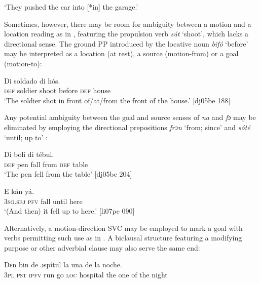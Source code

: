 \glt ‘They pushed the car into [*in] the garage.’ 
\z

Sometimes, however, there may be room for ambiguity between a motion and a location reading as in , featuring the propulsion verb \textit{sút} ‘shoot’, which lacks a directional sense. The ground PP introduced by the locative noun \textit{bifó} ‘before’ may be interpreted as a location (at rest), a source (motion-from) or a goal (motion-to): 


\ea%
    \label{ex:key:974}
    \gll Di  soldado          di  hós.\\
\textsc{def}  soldier  shoot  before  \textsc{def}  house\\

\glt ‘The soldier shot in front of/at/from the front of the house.’ [dj05be 188]
\z

Any potential ambiguity between the goal and source senses of \textit{na} and \textit{fɔ} may be eliminated by employing the directional prepositions \textit{frɔn} ‘from; since’  and \textit{sóté} ‘until; up to’ :


\ea%
    \label{ex:key:975}
    \gll Di  bolí        di  tébul.\\
\textsc{def}  pen  fall    from  \textsc{def}  table\\

\glt ‘The pen fell from the table’ [dj05be 204]
\z


\ea%
    \label{ex:key:976}
    \gll E    kán        yá.\\
\textsc{3sg.sbj}  \textsc{pfv}  fall    until  here\\

\glt ‘(And then) it fell up to here.’ [li07pe 090]
\z

Alternatively, a motion-direction SVC may be employed to mark a goal with verbs permitting such use as in . A biclausal structure featuring a modifying purpose or other adverbial clause may also serve the same end:


\ea%
    \label{ex:key:977}
    \gll Dɛn  bin  de       ɔspítul  la  una  de  la  noche.\\
\textsc{3pl}  \textsc{pst}  \textsc{ipfv}  run  go  \textsc{loc}  hospital  the  one   of  the  night\\

